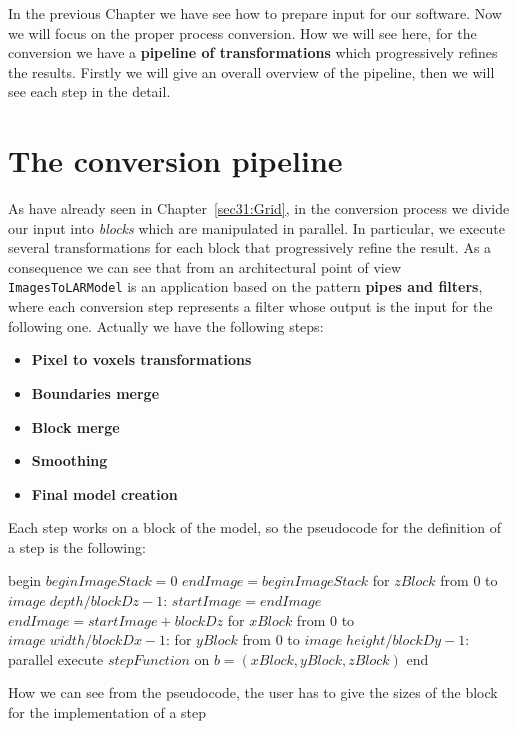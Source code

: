 In the previous Chapter we have see how to prepare input for our software. Now we will focus on the proper process conversion. How we will see here, for the conversion we have a \textbf{pipeline of transformations} which progressively refines the results. Firstly we will give an overall overview of the pipeline, then we will see each step in the detail.

\section{The conversion pipeline}\label{sec33:Pipeline}

As have already seen in Chapter~\ref{sec31:Grid}, in the conversion process we divide our input into \textit{blocks} which are manipulated in parallel. In particular, we execute several transformations for each block that progressively refine the result. As a consequence we can see that from an architectural point of view \texttt{ImagesToLARModel} is an application based on the pattern \textbf{pipes and filters}, where each conversion step represents a filter whose output is the input for the following one. Actually we have the following steps:
\begin{itemize}
 \item \textbf{Pixel to voxels transformations}
 \item \textbf{Boundaries merge}
 \item \textbf{Block merge}
 \item \textbf{Smoothing}
 \item \textbf{Final model creation}
\end{itemize}

Each step works on a block of the model, so the pseudocode for the definition of a step is the following:

\begin{pseudo}[caption={Single step of the conversion pipeline}, label={lst:stepInvocation}]
begin
  $beginImageStack = 0$
  $endImage = beginImageStack$
  for $zBlock$ from $0$ to $image\; depth / blockDz - 1$:
    $startImage = endImage$
    $endImage = startImage + blockDz$
    for $xBlock$ from $0$ to $image\; width / blockDx - 1$:
      for $yBlock$ from $0$ to $image\; height / blockDy - 1$:
        parallel execute $stepFunction$ on $b=(xBlock,yBlock,zBlock)$
end       
\end{pseudo}

How we can see from the pseudocode, the user has to give the sizes of the block for the implementation of a step

